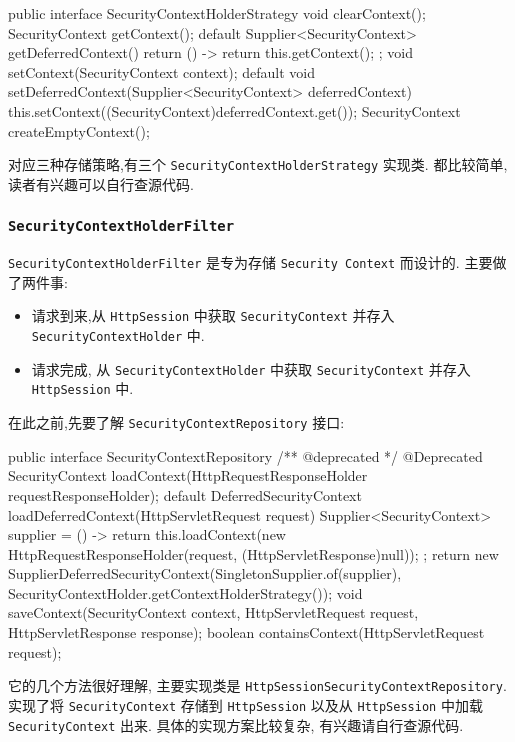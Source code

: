 \begin{Java}
public interface SecurityContextHolderStrategy {
    void clearContext();
    SecurityContext getContext();
    default Supplier<SecurityContext> getDeferredContext() {
        return () -> {
            return this.getContext();
        };
    }
    void setContext(SecurityContext context);
    default void setDeferredContext(Supplier<SecurityContext> deferredContext) {
        this.setContext((SecurityContext)deferredContext.get());
    }
    SecurityContext createEmptyContext();
}
\end{Java}

对应三种存储策略,有三个 \texttt{SecurityContextHolderStrategy}  实现类. 都比较简单,读者有兴趣可以自行查源代码.

\subsubsection*{\texttt{SecurityContextHolderFilter}}

\texttt{SecurityContextHolderFilter} 是专为存储 \texttt{Security Context} 而设计的. 主要做了两件事:
\begin{itemize}
  \item 请求到来,从 \texttt{HttpSession} 中获取 \texttt{SecurityContext} 并存入 \texttt{SecurityContextHolder} 中.
  \item 请求完成, 从 \texttt{SecurityContextHolder} 中获取 \texttt{SecurityContext} 并存入 \texttt{HttpSession} 中.
\end{itemize}

在此之前,先要了解 \texttt{SecurityContextRepository} 接口:

\begin{Java}
public interface SecurityContextRepository {
    /** @deprecated */
    @Deprecated
    SecurityContext loadContext(HttpRequestResponseHolder requestResponseHolder);
    default DeferredSecurityContext loadDeferredContext(HttpServletRequest request) {
        Supplier<SecurityContext> supplier = () -> {
            return this.loadContext(new HttpRequestResponseHolder(request, (HttpServletResponse)null));
        };
        return new SupplierDeferredSecurityContext(SingletonSupplier.of(supplier), SecurityContextHolder.getContextHolderStrategy());
    }
    void saveContext(SecurityContext context, HttpServletRequest request, HttpServletResponse response);
    boolean containsContext(HttpServletRequest request);
}
\end{Java}

它的几个方法很好理解, 主要实现类是 \texttt{HttpSessionSecurityContextRepository}. 实现了将 \texttt{SecurityContext} 存储到 \texttt{HttpSession} 以及从 \texttt{HttpSession} 中加载 \texttt{SecurityContext} 出来. 具体的实现方案比较复杂, 有兴趣请自行查源代码.

